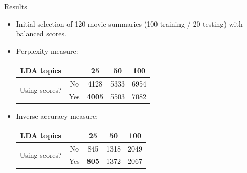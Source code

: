 \documentclass{beamer}
\begin{document}
\begin{frame}{Results}
	\begin{itemize}
	\item Initial selection of 120 movie summaries (100 training / 20 testing) with balanced scores.
	\item Perplexity measure:
	
	\begin{center}
	\begin{tabular}{cc|ccc}
		LDA topics      & & 25 & 50 & 100 \\ \hline
		\multirow{2}{*}{Using scores?} & No  & 4128 & 5333 & 6954 \\
		                               & Yes & \textbf{4005} & 5503 & 7082 \\
	\end{tabular}
	\end{center}
	
	\item Inverse accuracy measure:
	
	\begin{center}
	\begin{tabular}{cc|ccc}
		LDA topics      & & 25 & 50 & 100 \\ \hline
		\multirow{2}{*}{Using scores?} & No  & 845 & 1318 & 2049 \\
		                               & Yes & \textbf{805} & 1372 & 2067 \\
	\end{tabular}
	\end{center}
	\end{itemize}
\end{frame}
\end{document}
